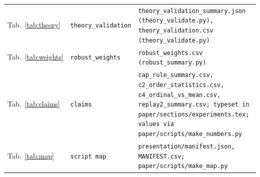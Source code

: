 \begin{longtable}{@{}p{0.55in} p{1.55in} p{3.0in}@{}}
Tab.~\ref{tab:theory} & \texttt{theory\_\allowbreak validation} & \texttt{theory\_\allowbreak validation\_\allowbreak summary.json (theory\_\allowbreak validate.py), theory\_\allowbreak validation.csv (theory\_\allowbreak validate.py)} \\
Tab.~\ref{tab:weights} & \texttt{robust\_\allowbreak weights} & \texttt{robust\_\allowbreak weights.csv (robust\_\allowbreak summary.py)} \\
Tab.~\ref{tab:claims} & \texttt{claims} & \texttt{cap\_\allowbreak rule\_\allowbreak summary.csv, c2\_\allowbreak order\_\allowbreak statistics.csv, c4\_\allowbreak ordinal\_\allowbreak vs\_\allowbreak mean.csv, replay2\_\allowbreak summary.csv; typeset in paper/sections/experiments.tex; values via paper/scripts/make\_\allowbreak numbers.py} \\
Tab.~\ref{tab:map} & \texttt{script map} & \texttt{presentation/manifest.json, MANIFEST.csv; paper/scripts/make\_\allowbreak map.py} \\
\end{longtable}
\addtocounter{table}{-1}
\endgroup
